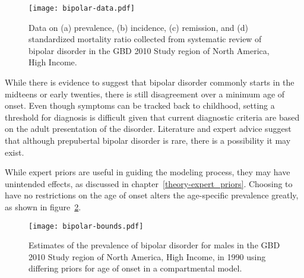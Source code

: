     \begin{figure}[h]
        \begin{center}
            \texttt{[image: bipolar-data.pdf]}
            \caption[Systematic review data for bipolar disorder.]{Data on 
            (a) prevalence, (b) incidence, (c) remission, and
              (d) standardized mortality ratio collected from systematic review
              of bipolar disorder in the GBD 2010 Study
              region of North America, High Income.}
            \label{fig:app-bipolar data}
        \end{center}
    \end{figure}

While there is evidence to suggest that bipolar disorder commonly
starts in the midteens or early twenties, there is still disagreement
over a minimum age of onset.  Even though symptoms can be tracked back
to childhood, setting a threshold for diagnosis is difficult given
that current diagnostic criteria are based on the adult presentation of
the disorder.  Literature and expert advice suggest that although
prepubertal bipolar disorder is rare, there is a possibility it may
exist. \cite{kloos_bipolar_2011, angst_historical_2000}

While expert priors are useful in guiding the modeling process, they
may have unintended effects, as discussed in chapter~\ref{theory-expert_priors}.
Choosing to have no restrictions on the
age of onset alters the age-specific prevalence greatly, as shown in
figure~\ref{fig:app-bipolar bounds}.

    \begin{figure}[h]
        \begin{center}
            \texttt{[image: bipolar-bounds.pdf]}
            \caption[Comparison of prevalence estimates for bipolar disorder
              using differing priors for the age of onset in a compartmental
              modle.]{Estimates of the prevalence of bipolar disorder
              for males in the GBD 2010 Study region of North America, High Income,
              in 1990 using differing priors for age of onset
              in a compartmental model.}
            \label{fig:app-bipolar bounds}
        \end{center}
    \end{figure}

